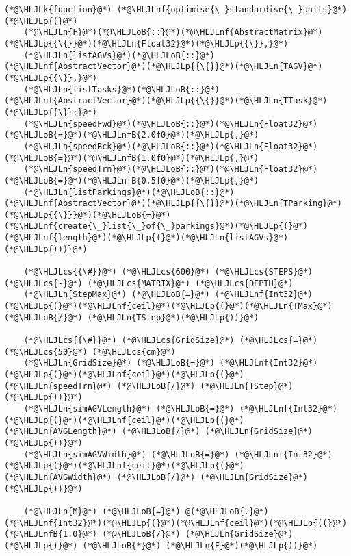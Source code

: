 \documentclass[12pt,a4paper]{article}
\newcommand{\HLJLk}[1]{\textcolor[RGB]{148,91,176}{\textbf{#1}}}
\newcommand{\HLJLn}[1]{#1}
\newcommand{\HLJLnf}[1]{\textcolor[RGB]{66,102,213}{#1}}
\newcommand{\HLJLnfB}[1]{\textcolor[RGB]{59,151,46}{#1}}
\newcommand{\HLJLoB}[1]{\textcolor[RGB]{102,102,102}{\textbf{#1}}}
\newcommand{\HLJLp}[1]{#1}
\newcommand{\HLJLcs}[1]{\textcolor[RGB]{153,153,119}{\textit{#1}}}
\begin{document}
\begin{lstlisting}
(*@\HLJLk{function}@*) (*@\HLJLnf{optimise{\_}standardise{\_}units}@*)(*@\HLJLp{(}@*)
    (*@\HLJLn{F}@*)(*@\HLJLoB{::}@*)(*@\HLJLnf{AbstractMatrix}@*)(*@\HLJLp{{\{}}@*)(*@\HLJLn{Float32}@*)(*@\HLJLp{{\}},}@*)
    (*@\HLJLn{listAGVs}@*)(*@\HLJLoB{::}@*)(*@\HLJLnf{AbstractVector}@*)(*@\HLJLp{{\{}}@*)(*@\HLJLn{TAGV}@*)(*@\HLJLp{{\}},}@*)
    (*@\HLJLn{listTasks}@*)(*@\HLJLoB{::}@*)(*@\HLJLnf{AbstractVector}@*)(*@\HLJLp{{\{}}@*)(*@\HLJLn{TTask}@*)(*@\HLJLp{{\}};}@*)
    (*@\HLJLn{speedFwd}@*)(*@\HLJLoB{::}@*)(*@\HLJLn{Float32}@*)(*@\HLJLoB{=}@*)(*@\HLJLnfB{2.0f0}@*)(*@\HLJLp{,}@*)
    (*@\HLJLn{speedBck}@*)(*@\HLJLoB{::}@*)(*@\HLJLn{Float32}@*)(*@\HLJLoB{=}@*)(*@\HLJLnfB{1.0f0}@*)(*@\HLJLp{,}@*)
    (*@\HLJLn{speedTrn}@*)(*@\HLJLoB{::}@*)(*@\HLJLn{Float32}@*)(*@\HLJLoB{=}@*)(*@\HLJLnfB{0.5f0}@*)(*@\HLJLp{,}@*)
    (*@\HLJLn{listParkings}@*)(*@\HLJLoB{::}@*)(*@\HLJLnf{AbstractVector}@*)(*@\HLJLp{{\{}}@*)(*@\HLJLn{TParking}@*)(*@\HLJLp{{\}}}@*)(*@\HLJLoB{=}@*)(*@\HLJLnf{create{\_}list{\_}of{\_}parkings}@*)(*@\HLJLp{(}@*)(*@\HLJLnf{length}@*)(*@\HLJLp{(}@*)(*@\HLJLn{listAGVs}@*)(*@\HLJLp{)))}@*)

    (*@\HLJLcs{{\#}}@*) (*@\HLJLcs{600}@*) (*@\HLJLcs{STEPS}@*) (*@\HLJLcs{-}@*) (*@\HLJLcs{MATRIX}@*) (*@\HLJLcs{DEPTH}@*)
    (*@\HLJLn{StepMax}@*) (*@\HLJLoB{=}@*) (*@\HLJLnf{Int32}@*)(*@\HLJLp{(}@*)(*@\HLJLnf{ceil}@*)(*@\HLJLp{(}@*)(*@\HLJLn{TMax}@*) (*@\HLJLoB{/}@*) (*@\HLJLn{TStep}@*)(*@\HLJLp{))}@*)

    (*@\HLJLcs{{\#}}@*) (*@\HLJLcs{GridSize}@*) (*@\HLJLcs{=}@*) (*@\HLJLcs{50}@*) (*@\HLJLcs{cm}@*)
    (*@\HLJLn{GridSize}@*) (*@\HLJLoB{=}@*) (*@\HLJLnf{Int32}@*)(*@\HLJLp{(}@*)(*@\HLJLnf{ceil}@*)(*@\HLJLp{(}@*)(*@\HLJLn{speedTrn}@*) (*@\HLJLoB{/}@*) (*@\HLJLn{TStep}@*)(*@\HLJLp{))}@*)
    (*@\HLJLn{simAGVLength}@*) (*@\HLJLoB{=}@*) (*@\HLJLnf{Int32}@*)(*@\HLJLp{(}@*)(*@\HLJLnf{ceil}@*)(*@\HLJLp{(}@*)(*@\HLJLn{AVGLength}@*) (*@\HLJLoB{/}@*) (*@\HLJLn{GridSize}@*)(*@\HLJLp{))}@*)
    (*@\HLJLn{simAGVWidth}@*) (*@\HLJLoB{=}@*) (*@\HLJLnf{Int32}@*)(*@\HLJLp{(}@*)(*@\HLJLnf{ceil}@*)(*@\HLJLp{(}@*)(*@\HLJLn{AVGWidth}@*) (*@\HLJLoB{/}@*) (*@\HLJLn{GridSize}@*)(*@\HLJLp{))}@*)

    (*@\HLJLn{M}@*) (*@\HLJLoB{=}@*) @(*@\HLJLoB{.}@*) (*@\HLJLnf{Int32}@*)(*@\HLJLp{(}@*)(*@\HLJLnf{ceil}@*)(*@\HLJLp{((}@*)(*@\HLJLnfB{1.0}@*) (*@\HLJLoB{/}@*) (*@\HLJLn{GridSize}@*)(*@\HLJLp{)}@*) (*@\HLJLoB{*}@*) (*@\HLJLn{F}@*)(*@\HLJLp{))}@*)


\end{lstlisting}
\end{document}
